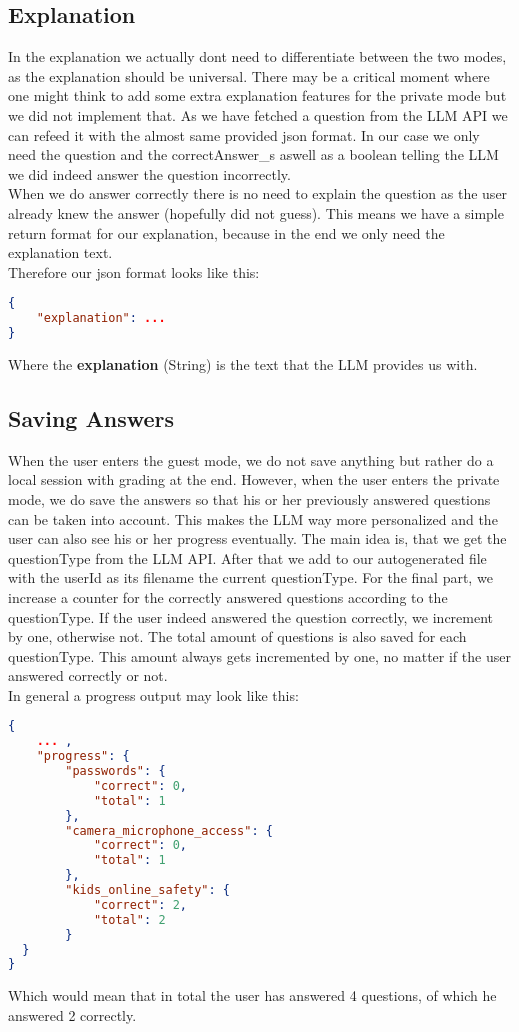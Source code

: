 \subsection{Explanation}
In the explanation we actually dont need to differentiate between the two modes, as the explanation should be universal.
There may be a critical moment where one might think to add some extra explanation features for the private mode but we did not implement that.
As we have fetched a question from the LLM API we can refeed it with the almost same provided json format.
In our case we only need the question and the correctAnswer\_s aswell as a boolean telling the LLM we did indeed answer the question incorrectly. \\
When we do answer correctly there is no need to explain the question as the user already knew the answer (hopefully did not guess).
This means we have a simple return format for our explanation, because in the end we only need the explanation text. \\
Therefore our json format looks like this:
\begin{lstlisting}[language=json,firstnumber=1]
{
    "explanation": ... 
}
\end{lstlisting}
Where the \textbf{explanation} (String) is the text that the LLM provides us with.

\subsection{Saving Answers}
When the user enters the guest mode, we do not save anything but rather do a local session with grading at the end.
However, when the user enters the private mode, we do save the answers so that his or her previously answered questions can be taken into account.
This makes the LLM way more personalized and the user can also see his or her progress eventually.
The main idea is, that we get the questionType from the LLM API.
After that we add to our autogenerated file with the userId as its filename the current questionType.
For the final part, we increase a counter for the correctly answered questions according to the questionType.
If the user indeed answered the question correctly, we increment by one, otherwise not.
The total amount of questions is also saved for each questionType.
This amount always gets incremented by one, no matter if the user answered correctly or not. \\
In general a progress output may look like this:
\begin{lstlisting}[language=json,firstnumber=1]
{
    ... ,
    "progress": {
        "passwords": {
            "correct": 0,
            "total": 1
        },
        "camera_microphone_access": {
            "correct": 0,
            "total": 1
        },
        "kids_online_safety": {
            "correct": 2,
            "total": 2
        }
  }
}
\end{lstlisting}
Which would mean that in total the user has answered 4 questions, of which he answered 2 correctly.

